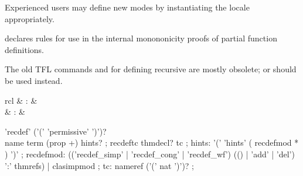 \begin{isabellebody}
\begin{isamarkuptext}
\begin{description}
  Experienced users may define new modes by instantiating the locale
   appropriately.

  \item \hyperlink{attribute.HOL.partial-function-mono}{\mbox{}} declares rules for
  use in the internal monononicity proofs of partial function
  definitions.

  \end{description}%
\end{isamarkuptext}%
\isamarkuptrue%
%
\isamarkuptrue%
%
\begin{isamarkuptext}%
The old TFL commands \hyperlink{command.HOL.recdef}{\mbox{}} and \hyperlink{command.HOL.recdef-tc}{\mbox{}} for defining recursive are mostly obsolete; \hyperlink{command.HOL.function}{\mbox{}} or \hyperlink{command.HOL.fun}{\mbox{}} should be used instead.

  \begin{matharray}{rcl}
    \hypertarget{command.HOL.recdef}{\hyperlink{command.HOL.recdef}{\mbox{}}} & : &  \\
    \hypertarget{command.HOL.recdef-tc}{\hyperlink{command.HOL.recdef-tc}{\mbox{}}} & : &  \\
  \end{matharray}

  \begin{rail}
    'recdef' ('(' 'permissive' ')')? \\ name term (prop +) hints?
    ;
    recdeftc thmdecl? tc
    ;
    hints: '(' 'hints' ( recdefmod * ) ')'
    ;
    recdefmod: (('recdef_simp' | 'recdef_cong' | 'recdef_wf') (() | 'add' | 'del') ':' thmrefs) | clasimpmod
    ;
    tc: nameref ('(' nat ')')?
    ;
  \end{rail}


\end{isamarkuptext}
\end{isabellebody}
